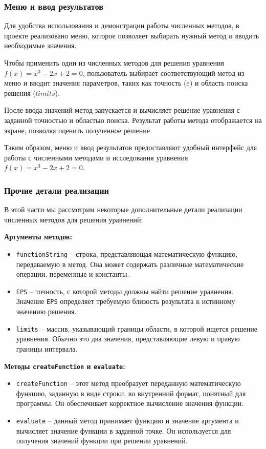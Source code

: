 \documentclass[12pt]{article}
\begin{document}
    \subsubsection{Меню и ввод результатов}
    Для удобства использования и демонстрации работы численных методов, в проекте реализовано меню, которое позволяет выбирать нужный метод и вводить необходимые значения.


    Чтобы применить один из численных методов для решения уравнения $f(x) = x^3 - 2x + 2=0$, пользователь выбирает соответствующий метод из меню и вводит значения параметров, таких как точность ($\varepsilon$) и область поиска решения ($limits$).

    После ввода значений метод запускается и вычисляет решение уравнения с заданной точностью и областью поиска. Результат работы метода отображается на экране, позволяя оценить полученное решение.

    Таким образом, меню и ввод результатов предоставляют удобный интерфейс для работы с численными методами и исследования уравнения $f(x) = x^3 - 2x + 2=0$.

    \subsubsection{Прочие детали реализации}
    В этой части мы рассмотрим некоторые дополнительные детали реализации численных методов для решения уравнений:

    \textbf{Аргументы методов:}
    \begin{itemize}
        \item \texttt{functionString} -- строка, представляющая математическую функцию, передаваемую в метод. Она может содержать различные математические операции, переменные и константы.
        \item \texttt{EPS} -- точность, с которой методы должны найти решение уравнения. Значение \texttt{EPS} определяет требуемую близость результата к истинному значению решения.
        \item \texttt{limits} -- массив, указывающий границы области, в которой ищется решение уравнения. Обычно это два значения, представляющие левую и правую границы интервала.
    \end{itemize}

    \textbf{Методы \texttt{createFunction} и \texttt{evaluate}:}
    \begin{itemize}
        \item \texttt{createFunction} -- этот метод преобразует переданную математическую функцию, заданную в виде строки, во внутренний формат, понятный для программы. Он обеспечивает корректное вычисление значения функции.
        \item \texttt{evaluate} -- данный метод принимает функцию и значение аргумента и вычисляет значение функции в заданной точке. Он используется для получения значений функции при решении уравнений.
    \end{itemize}
\end{document}
